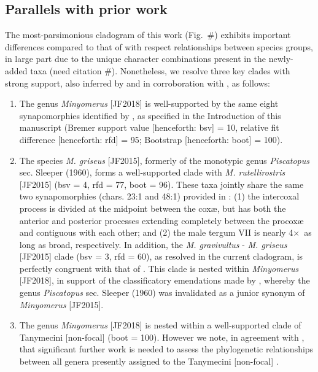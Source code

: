 \documentclass[fleqn,10pt,lineno]{wlpeerj} %
\newcommand{\x}{$\times$~}
\begin{document}
	\subsection*{Parallels with prior work}
		The most-parsimonious cladogram of this work (Fig.~\#) exhibits important differences compared to that of \citet{jansen2015} with respect relationships between species groups, in large part due to the unique character combinations present in the newly-added taxa (need citation \#).
		Nonetheless, we resolve three key clades with strong support, also inferred by and in corroboration with \citet{jansen2015}, as follows:
		\begin{enumerate}
			\item The genus \textit{Minyomerus} [JF2018] is well-supported by the same eight synapomorphies identified by \citet{jansen2015}, as specified in the Introduction of this manuscript (Bremer support value [henceforth: bsv] = 10, relative fit difference [henceforth: rfd] = 95; Bootstrap [henceforth: boot] = 100).
			\item The species \textit{M. griseus} [JF2015], formerly of the monotypic genus \textit{Piscatopus} sec. Sleeper (1960), forms a well-supported clade with \textit{M. rutellirostris} [JF2015] (bsv = 4, rfd = 77, boot = 96). These taxa jointly share the same two synapomorphies (chars. 23:1 and 48:1) provided in \citet{jansen2015}: (1) the intercoxal process is divided at the midpoint between the cox{\ae}, but has both the anterior and posterior processes extending completely between the procox{\ae} and contiguous with each other; and (2) the male tergum VII is nearly 4\x as long as broad, respectively. In addition, the \textit{M. gravivultus} - \textit{M. griseus} [JF2015] clade (bsv = 3, rfd = 60), as resolved in the current cladogram, is perfectly congruent with that of \citet{jansen2015}. This clade is nested within \textit{Minyomerus} [JF2018], in support of the classificatory emendations made by \citet{jansen2015}, whereby the genus \textit{Piscatopus} sec. Sleeper (1960) was invalidated as a junior synonym of \textit{Minyomerus} [JF2015].
			\item The genus \textit{Minyomerus} [JF2018] is nested within a well-supported clade of Tanymecini [non-focal] (boot = 100). However we note, in agreement with \citet{jansen2015}, that significant further work is needed to assess the phylogenetic relationships between all genera presently assigned to the Tanymecini [non-focal] \citep{alonso1999}.
		\end{enumerate}
	
\end{document}
